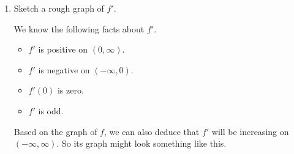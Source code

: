 \documentclass{article}
\begin{document}
\begin{enumerate}
\begin{enumerate}
\begin{enumerate}
    \item


      \begin{problem}[\stretch{0.5}]
        Is $f$ even, odd, or neither? Is $f'$ even, odd, or neither? Explain.
      \end{problem}

      \begin{solution}
        $f$ is an even function because the graph of $f$ is symmetric over the $y$-axis.
        Since we do not have a graph of $f'$, we should use the algebraic tests for even/odd symmetry. 
        Looking at the graph of $f$, 
        $f'(2)$ is positive and
        $f'(-2)$ is negative. Because of the even symmetry of $f$, it seems reasonable that $f'(-2)=-f'(2)$, and in general,
        $f'(-a)=-f'(a)$. This means that $f'$ is odd.
      \end{solution}

    \end{enumerate}

  \item


    \begin{problem}[\vfill\newpage]
      Sketch a rough graph of $f'$.
    \end{problem}

    \begin{solution}
      We know the following facts about $f'$.
      \begin{itemize}
        \item $f'$ is positive on $(0, \infty)$.
        \item $f'$ is negative on $(-\infty, 0)$. 
        \item $f'(0)$ is zero.
        \item $f'$ is odd.
      \end{itemize}
      Based on the graph of $f$, we can also deduce that $f'$ will be increasing on $(-\infty, \infty)$. So its graph
      might look something like this.
      \begin{center}
      \end{center}
    \end{solution}


\end{enumerate}
\end{enumerate}
\end{document}
